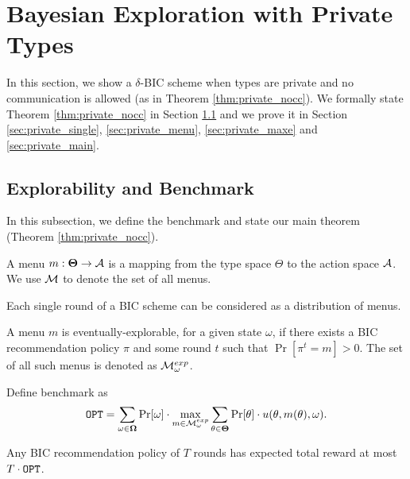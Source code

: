 
\section{Bayesian Exploration with Private Types}
\label{sec:private_nc}

In this section, we show a $\delta$-BIC scheme when types are private and no communication is allowed (as in Theorem \ref{thm:private_nocc}). We formally state Theorem \ref{thm:private_nocc} in Section \ref{sec:private_bench} and we prove it in Section \ref{sec:private_single}, \ref{sec:private_menu}, \ref{sec:private_maxe} and \ref{sec:private_main}.

\subsection{Explorability and Benchmark}
\label{sec:private_bench}
In this subsection, we define the benchmark and state our main theorem (Theorem \ref{thm:private_nocc}). 

\begin{definition}
A menu $m: \bold{\Theta} \rightarrow \mathcal{A}$ is a mapping from the type space $\varTheta$ to the action space $\mathcal{A}$. We use $\mathcal{M}$ to denote the set of all menus.
\end{definition}

\begin{claim}
Each single round of a BIC scheme can be considered as a distribution of menus.
\end{claim}

\begin{definition}
\label{def:private_exp}
A menu $m$ is eventually-explorable, for a given state $\omega$, if there exists a BIC recommendation policy $\pi$ and some round $t$ such that $\Pr[\pi^t= m]> 0$. The set of all such menus is denoted as $\mathcal{M}_{\omega}^{exp}$.
\end{definition}

\begin{definition}[Benchmark]
Define benchmark as 
\[
\mathtt{OPT} = \sum_{\omega\in \bold{\Omega}} \Pr[\omega] \cdot\max_{m \in \mathcal{M}_{\omega}^{exp}}\sum_{\theta \in \bold{\Theta}} \Pr[\theta] \cdot  u(\theta, m(\theta), \omega).
\]
\end{definition}

\begin{claim}
Any BIC recommendation policy of $T$ rounds has expected total reward at most $T \cdot\mathtt{OPT}$.  
\end{claim}

